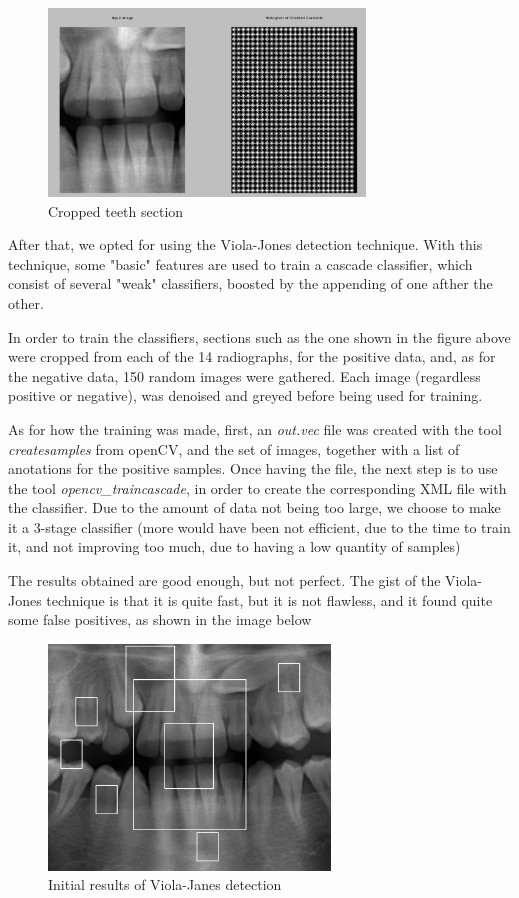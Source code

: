 \begin{figure}[h]
  \centering
  \includegraphics[height=5cm]{img/teeth_hog}
  \caption{Cropped teeth section}
\end{figure}

After that, we opted for using the Viola-Jones detection technique. With this
technique, some "basic" features are used to train a cascade classifier, which
consist of several "weak" classifiers, boosted by the appending of one afther
the other. 

In order to train the classifiers, sections such as the one shown in the figure
above were cropped from each of the 14 radiographs, for the positive data, and,
as for the negative data, 150 random images were gathered. Each image
(regardless positive or negative), was denoised and greyed before being used for
training. 

As for how the training was made, first, an \textit{out.vec} file was created with the
tool \textit{createsamples} from openCV, and the set of images, together with a list
of anotations for the positive samples. Once having the file, the next step
is to use the tool \textit{opencv\_traincascade}, in order to create the
corresponding XML file with the classifier. Due to the amount of data not
being too large, we choose to make it a 3-stage classifier (more would have been
not efficient, due to the time to train it, and not improving too much, due to
having a low quantity of samples)

The results obtained are good enough, but not perfect. The gist of
the Viola-Jones technique is that it is quite fast, but it is not flawless, and
it found quite some false positives, as shown in the image below

\begin{figure}[h]
  \centering
  \includegraphics[height=6cm]{img/teeth_detection_1}
  \caption{Initial results of Viola-Janes detection}
\end{figure}

